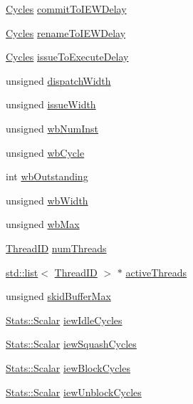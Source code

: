 \begin{DoxyCompactItemize}
\item 
\hyperlink{classCycles}{Cycles} \hyperlink{classDefaultIEW_a6b6fe1148ed7c40758e45f351c375552}{commitToIEWDelay}
\item 
\hyperlink{classCycles}{Cycles} \hyperlink{classDefaultIEW_a72426b859bd857b77c8402cc6bc1ac7a}{renameToIEWDelay}
\item 
\hyperlink{classCycles}{Cycles} \hyperlink{classDefaultIEW_a40f102cb54be0bc75cfbd9a70b696091}{issueToExecuteDelay}
\item 
unsigned \hyperlink{classDefaultIEW_acd9a559a5f1d57c32c03c9a5b4299089}{dispatchWidth}
\item 
unsigned \hyperlink{classDefaultIEW_a574eb3fb1659bd364f4f613662fa2ead}{issueWidth}
\item 
unsigned \hyperlink{classDefaultIEW_a5fa0799bf5569437190dd1eda1d62b7b}{wbNumInst}
\item 
unsigned \hyperlink{classDefaultIEW_ad2c7b2687f864f2b7359eb393276996f}{wbCycle}
\item 
int \hyperlink{classDefaultIEW_a225199c05fd7bddaf95d0d79171b31dc}{wbOutstanding}
\item 
unsigned \hyperlink{classDefaultIEW_a97c827109db73fbbd67c50a90eccf7ac}{wbWidth}
\item 
unsigned \hyperlink{classDefaultIEW_a4feeca4f9ab71ed25ed257f08a09fe0e}{wbMax}
\item 
\hyperlink{base_2types_8hh_ab39b1a4f9dad884694c7a74ed69e6a6b}{ThreadID} \hyperlink{classDefaultIEW_a88377f855dbf5adeeecb06b5bb821d35}{numThreads}
\item 
\hyperlink{classstd_1_1list}{std::list}$<$ \hyperlink{base_2types_8hh_ab39b1a4f9dad884694c7a74ed69e6a6b}{ThreadID} $>$ $\ast$ \hyperlink{classDefaultIEW_af6eaea53db532812052f71bf0380dab5}{activeThreads}
\item 
unsigned \hyperlink{classDefaultIEW_a268414a6444b620140f263013a739a17}{skidBufferMax}
\item 
\hyperlink{classStats_1_1Scalar}{Stats::Scalar} \hyperlink{classDefaultIEW_a9da3679b5e992aaed3de418432902a59}{iewIdleCycles}
\item 
\hyperlink{classStats_1_1Scalar}{Stats::Scalar} \hyperlink{classDefaultIEW_acb215c0a56967a158558f7e8018cb68e}{iewSquashCycles}
\item 
\hyperlink{classStats_1_1Scalar}{Stats::Scalar} \hyperlink{classDefaultIEW_a29d41a8f53acdfa4edcfa2c3238c8052}{iewBlockCycles}
\item 
\hyperlink{classStats_1_1Scalar}{Stats::Scalar} \hyperlink{classDefaultIEW_aa77818f080dcd03ea5f5f593768b1740}{iewUnblockCycles}

\end{DoxyCompactItemize}
